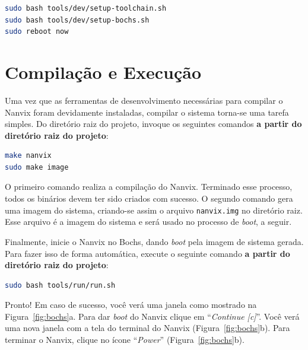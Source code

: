 \documentclass[11pt]{article}
\begin{document}
\begin{lstlisting}[language=bash,numbers=none,frame=single]
sudo bash tools/dev/setup-toolchain.sh
sudo bash tools/dev/setup-bochs.sh
sudo reboot now
\end{lstlisting}

\section{Compilação e Execução}
\label{sec:compilacao}

Uma vez que as ferramentas de desenvolvimento necessárias para compilar o Nanvix foram devidamente instaladas, compilar o sistema torna-se uma tarefa simples. Do diretório raiz do projeto, invoque os seguintes comandos \textbf{a partir do diretório raiz do projeto}:\\

\begin{lstlisting}[language=bash,numbers=none,frame=single]
make nanvix
sudo make image
\end{lstlisting}

O primeiro comando realiza a compilação do Nanvix. Terminado esse processo, todos os binários devem ter sido criados com sucesso. O segundo comando gera uma imagem do sistema, criando-se assim o arquivo \texttt{nanvix.img} no diretório raiz. Esse arquivo é a imagem do sistema e será usado no processo de \textit{boot}, a seguir.

Finalmente, inicie o Nanvix no Bochs, dando \textit{boot} pela imagem de sistema gerada. Para fazer isso de forma automática, execute o seguinte comando \textbf{a partir do diretório raiz do projeto}:\\

\begin{lstlisting}[language=bash,numbers=none,frame=single]
sudo bash tools/run/run.sh
\end{lstlisting}

Pronto! Em caso de sucesso, você verá uma janela como mostrado na Figura~\ref{fig:bochs}a. Para dar \textit{boot} do Nanvix clique em ``\textit{Continue [c]}''. Você verá uma nova janela com a tela do terminal do Nanvix (Figura~\ref{fig:bochs}b). Para terminar o Nanvix, clique no ícone ``\textit{Power}'' (Figura~\ref{fig:bochs}b).
\end{document}
